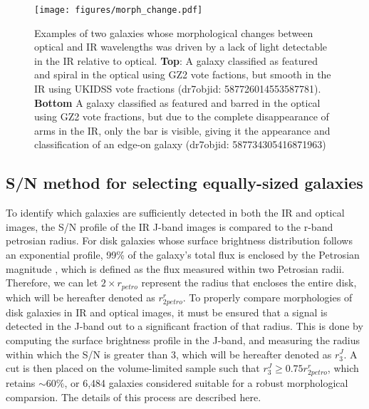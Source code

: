 \begin{figure}
\centering
\texttt{[image: figures/morph\_change.pdf]}
\caption{Examples of two galaxies whose morphological changes between optical and IR wavelengths was driven by a lack of light detectable in the IR relative to optical. \textbf{Top}: A galaxy classified as featured and spiral in the optical using GZ2 vote factions, but smooth in the IR using UKIDSS vote fractions (dr7objid: 587726014553587781). \textbf{Bottom} A galaxy classified as featured and barred in the optical using GZ2 vote fractions, but due to the complete disappearance of arms in the IR, only the bar is visible, giving it the appearance and classification of an edge-on galaxy (dr7objid: 587734305416871963) }
\label{fig:morph_change}
\end{figure}


\subsection{S/N method for selecting equally-sized galaxies}

To identify which galaxies are sufficiently detected in both the IR and optical images, the S/N profile of the IR J-band images is compared to the r-band petrosian radius. For disk galaxies whose surface brightness distribution follows an exponential profile, 99\% of the galaxy's total flux is enclosed by the Petrosian magnitude \citep{Graham2005}, which is defined as the flux measured within two Petrosian radii. Therefore, we can let $2\times r_{petro}$ represent the radius that encloses the entire disk, which will be hereafter denoted as $r^{r}_{2petro}$. To properly compare morphologies of disk galaxies in IR and optical images, it must be ensured that a signal is detected in the J-band out to a significant fraction of that radius. This is done by computing the surface brightness profile in the J-band, and measuring the radius within which the S/N is greater than 3, which will be hereafter denoted as $r^{J}_{3}$. A cut is then placed on the volume-limited sample such that $r^{J}_{3} \ge 0.75  r^{r}_{2petro}$, which retains $\sim 60\%$, or 6,484 galaxies considered suitable for a robust morphological comparsion. The details of this process are described here. 


